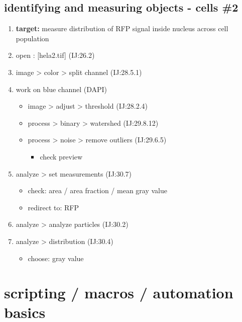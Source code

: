 \documentclass[11pt]{article}
\begin{document}
\subsection{identifying and measuring objects - cells \#2}
\label{sec-6-3}
\begin{enumerate}
\item \textbf{target:} measure distribution of RFP signal inside nucleus
across cell population
\item open : [hela2.tif] (IJ:26.2)
\item image > color > split channel (IJ:28.5.1)
\item work on blue channel (DAPI)
\begin{itemize}
\item image > adjust > threshold (IJ:28.2.4)
\item process > binary > watershed (IJ:29.8.12)
\item process > noise > remove outliers (IJ:29.6.5)
\begin{itemize}
\item check preview
\end{itemize}
\end{itemize}
\item analyze > set measurements (IJ:30.7)
\begin{itemize}
\item check: area / area fraction / mean gray value
\item redirect to: RFP
\end{itemize}
\item analyze > analyze particles  (IJ:30.2)
\item analyze > distribution (IJ:30.4)
\begin{itemize}
\item choose: gray value
\end{itemize}
\end{enumerate}

\section{scripting / macros / automation basics}
\label{sec-7}
\end{document}

